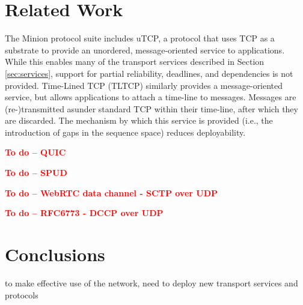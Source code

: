 \documentclass{sig-alternate-05-2015}
\newcommand{\todo}[1]{\textbf{\textcolor{red}{To do -- #1}}}
\begin{document}
\section{Related Work}
\label{sec:related}

%
% 

The Minion protocol suite \cite{nowlan:2012:minion} includes uTCP, a
protocol that uses TCP as a substrate to provide an unordered,
message-oriented service to applications. While this enables many of
the transport services described in Section \ref{sec:services}, support for
partial reliability, deadlines, and dependencies is not provided. 
Time-Lined TCP (TLTCP) \cite{mukherjee:2000:timelines} similarly provides a
message-oriented service, but allows applications to attach a time-line
to messages. Messages are (re-)transmitted asunder standard TCP within
their time-line, after which they are discarded. The mechanism by which
this service is provided (i.e., the introduction of gaps in the sequence
space) reduces deployability.

\todo{QUIC}

\todo{SPUD}

\todo{WebRTC data channel - SCTP over UDP}

\todo{RFC6773 - DCCP over UDP}


\section{Conclusions}
\label{sec:conclusions}

to make effective use of the network, need to deploy new transport services
and protocols
\end{document}
